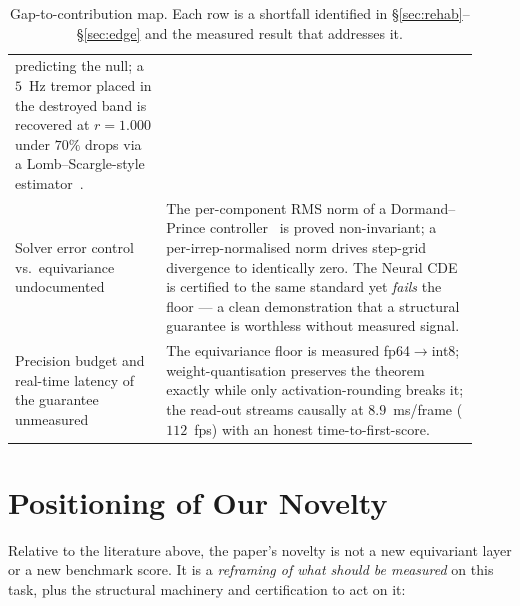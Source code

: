 \documentclass[11pt]{article}
\begin{document}
\begin{table}[h]
\begin{tabular}{p{0.30\linewidth} p{0.62\linewidth}}
    predicting the null; a $5$~Hz tremor placed in the destroyed band is recovered at
    $r=1.000$ under $70\%$ drops via a Lomb--Scargle-style estimator~\cite{vanderplas2018lombscargle}. \\
Solver error control vs.\ equivariance undocumented
  & The per-component RMS norm of a Dormand--Prince controller~\cite{dormand1980prince}
    is proved non-invariant; a per-irrep-normalised norm drives step-grid divergence to
    identically zero. The Neural CDE~\cite{kidger2020neuralcde} is certified to the same
    standard yet \emph{fails} the floor --- a clean demonstration that a structural
    guarantee is worthless without measured signal. \\
Precision budget and real-time latency of the guarantee unmeasured
  & The equivariance floor is measured fp64$\to$int8; weight-quantisation preserves the
    theorem exactly while only activation-rounding breaks it; the read-out streams
    causally at $8.9$~ms/frame ($112$~fps) with an honest time-to-first-score. \\
\bottomrule
\end{tabular}
\caption{Gap-to-contribution map. Each row is a shortfall identified in
\S\ref{sec:rehab}--\S\ref{sec:edge} and the measured result that addresses it.}
\label{tab:synth}
\end{table}

\section{Positioning of Our Novelty}
\label{sec:novelty}

Relative to the literature above, the paper's novelty is not a new equivariant
layer or a new benchmark score. It is a \emph{reframing of what should be measured}
on this task, plus the structural machinery and certification to act on it:
\end{document}
